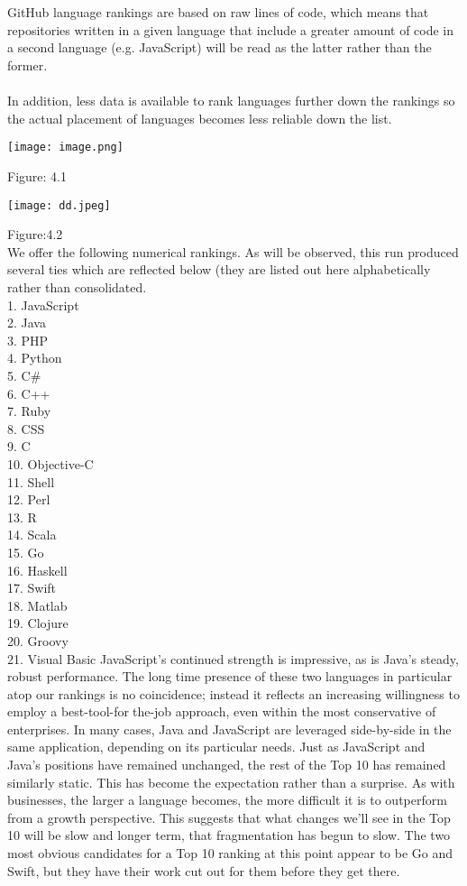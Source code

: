 \documentclass[a4paper, 12pt]{report}
\begin{document}
\\ \\ GitHub language rankings are based on raw lines of code, which means that repositories written in a given language that 
include a greater amount of code in a second language (e.g. JavaScript) will be read as the latter rather than the former.
\\ \\ In addition, less data is available to rank languages further down the rankings so the actual placement of languages 
becomes less reliable down the list.\\
\begin{center}
    \texttt{[image: image.png]}
\end{center}
Figure: 4.1\\
\begin{center}
    \texttt{[image: dd.jpeg]}
\end{center}
Figure:4.2\\
We offer the following numerical rankings. As will be observed, this run produced several ties which are reflected below (they 
are listed out here alphabetically rather than consolidated.
\\1. JavaScript
\\2. Java
\\3. PHP
\\4. Python
\\5. C#
\\6. C++
\\7. Ruby
\\8. CSS
\\9. C
\\10. Objective-C
\\11. Shell
\\12. Perl
\\13. R
\\14. Scala
\\15. Go
\\16. Haskell
\\17. Swift
\\18. Matlab
\\19. Clojure
\\20. Groovy
\\21. Visual Basic
JavaScript’s continued strength is impressive, as is Java’s steady, robust performance. The long time presence of these two 
languages in particular atop our rankings is no coincidence; instead it reflects an increasing willingness to employ a best-tool-forthe-job approach, even within the most conservative of enterprises. In many cases, Java and JavaScript are leveraged side-by-side 
in the same application, depending on its particular needs. Just as JavaScript and Java’s positions have remained unchanged, the 
rest of the Top 10 has remained similarly static. This has become the expectation rather than a surprise. As with businesses, the 
larger a language becomes, the more difficult it is to outperform from a growth perspective. This suggests that what changes we’ll 
see in the Top 10 will be slow and longer term, that fragmentation has begun to slow. The two most obvious candidates for a Top 
10 ranking at this point appear to be Go and Swift, but they have their work cut out for them before they get there.
\end{document}
